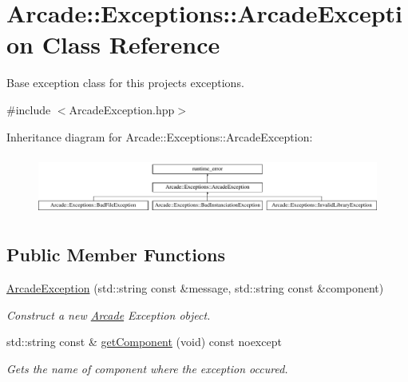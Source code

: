 \hypertarget{classArcade_1_1Exceptions_1_1ArcadeException}{}\section{Arcade\+::Exceptions\+::Arcade\+Exception Class Reference}
\label{classArcade_1_1Exceptions_1_1ArcadeException}


Base exception class for this projects\textquotesingle{} exceptions.  




{\ttfamily \#include $<$Arcade\+Exception.\+hpp$>$}

Inheritance diagram for Arcade\+::Exceptions\+::Arcade\+Exception\+:\begin{figure}[H]
\begin{center}
\leavevmode
\includegraphics[height=1.985816cm]{classArcade_1_1Exceptions_1_1ArcadeException}
\end{center}
\end{figure}
\subsection*{Public Member Functions}
\begin{DoxyCompactItemize}
\item 
\mbox{\hyperlink{classArcade_1_1Exceptions_1_1ArcadeException_a054c4f79319af87bfbbe79fa03809b38}{Arcade\+Exception}} (std\+::string const \&message, std\+::string const \&component)
\begin{DoxyCompactList}\small\item\em Construct a new \mbox{\hyperlink{namespaceArcade}{Arcade}} Exception object. \end{DoxyCompactList}\item 
std\+::string const  \& \mbox{\hyperlink{classArcade_1_1Exceptions_1_1ArcadeException_aa000c618b4fbe4a3612f511074243ce9}{get\+Component}} (void) const noexcept
\begin{DoxyCompactList}\small\item\em Gets the name of component where the exception occured. \end{DoxyCompactList}\end{DoxyCompactItemize}


